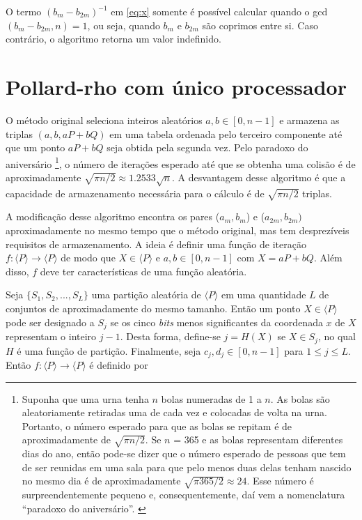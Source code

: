 O termo $(b_m - b_{2m})^{-1}$ em \ref{eq:x} somente é possível calcular quando o gcd$(b_m - b_{2m}, n) = 1$, ou seja, quando \(b_m\) e \(b_{2m}\) são coprimos entre si. Caso contrário, o algoritmo retorna um valor indefinido.

%
%
\section{Pollard-rho com único processador}
O método original seleciona inteiros aleatórios $a, b \in [0, n-1]$ e armazena as triplas $(a, b, aP + bQ)$ em uma tabela ordenada pelo terceiro componente até que um ponto $aP + bQ$ seja obtida pela segunda vez. Pelo paradoxo do aniversário
\footnote{Suponha que uma urna tenha \(n\) bolas numeradas de 1 a \(n\). As bolas são aleatoriamente retiradas uma de cada vez e colocadas de volta na urna. Portanto, o número esperado para que as bolas se repitam é de aproximadamente de $\sqrt{\pi n/2}$. Se \(n\) = 365 e as bolas representam diferentes dias do ano, então pode-se dizer que o número esperado de pessoas que tem de ser reunidas em uma sala para que pelo menos duas delas tenham nascido no mesmo dia é de aproximadamente $\sqrt{\pi 365/2} \approx 24$. Esse número é surpreendentemente pequeno e, consequentemente, daí vem a nomenclatura ``paradoxo do aniversário''. \cite{Guide}},
o número de iterações esperado até que se obtenha uma colisão é de aproximadamente $\sqrt{\pi n/2} \approx 1.2533 \sqrt{n}$. A desvantagem desse algoritmo é que a capacidade de armazenamento necessária para o cálculo é de $\sqrt{\pi n/2}$ triplas.

A modificação desse algoritmo encontra os pares ($a_m, b_m$) e ($a_{2m}, b_{2m})$ aproximadamente no mesmo tempo que o método original, mas tem desprezíveis requisitos de armazenamento. A ideia é definir uma função de iteração $f : \langle P \rangle \to \langle P \rangle$ de modo que $X \in \langle P \rangle$ e $a, b \in [0, n-1]$ com $X = aP + bQ$. Além disso, \(f\) deve ter características de uma função aleatória.

Seja $\{S_1, S_2, ..., S_L\}$ uma partição aleatória de $\langle P \rangle$ em uma quantidade \(L\) de conjuntos de aproximadamente do mesmo tamanho. Então um ponto $X \in \langle P \rangle$ pode ser designado a \(S_j\) se os cinco \textit{bits} menos significantes da coordenada \(x\) de \(X\) representam o inteiro \(j-1\). Desta forma, define-se $j = H(X)$ se $X \in S_j$, no qual \(H\) é uma função de partição. Finalmente, seja $c_j, d_j \in [0, n-1]$ para $1 \leq j \leq L$. Então $f : \langle P \rangle \to  \langle P \rangle$ é definido por

